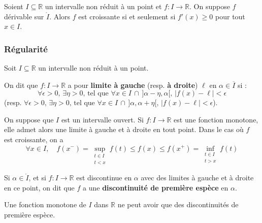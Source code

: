 
	\begin{proposition}
		Soient $I \subseteq \mathbb{R}$ un intervalle non réduit à un point et $f : I \rightarrow \mathbb{R}$. On suppose $f$ dérivable sur $\mathring{I}$. Alors $f$ est croissante si et seulement si $f'(x) \geq 0$ pour tout $x \in I$.
	\end{proposition}

	\subsubsection{Régularité}


	Soit $I \subseteq \mathbb{R}$ un intervalle non réduit à un point.

	\begin{definition}
		On dit que $f : I \rightarrow \mathbb{R}$ a pour \textbf{limite à gauche} (resp. \textbf{à droite}) $\ell$ en $\alpha \in \overline{I}$ si :
		\[ \forall \epsilon > 0, \, \exists \eta > 0, \, \text{tel que } \forall x \in I \, \cap \, ]\alpha-\eta, \alpha[, \, |f(x) - \ell| < \epsilon \]
		(resp. $\forall \epsilon > 0, \, \exists \eta > 0, \, \text{tel que } \forall x \in I \, \cap \, ]\alpha, \alpha+\eta[, \, |f(x) - \ell| < \epsilon$).
	\end{definition}

	\begin{theorem}
		On suppose que $I$ est un intervalle ouvert. Si $f : I \rightarrow \mathbb{R}$ est une fonction monotone, elle admet alors une limite à gauche et à droite en tout point. Dans le cas où $f$ est croissante, on a
		\[ \forall x \in I, \quad f(x^-) = \sup_{\substack{t \in I \\ t < x}} f(t) \leq f(x) \leq f(x^+) = \inf_{\substack{t \in I \\ t > x}} f(t) \]
	\end{theorem}

	\begin{definition}
		Si $\alpha \in \mathring{I}$, et si $f : I \rightarrow \mathbb{R}$ est discontinue en $\alpha$ avec des limites à gauche et à droite en ce point, on dit que $f$ a une \textbf{discontinuité de première espèce} en $\alpha$.
	\end{definition}

	\begin{proposition}
		Une fonction monotone de $I$ dans $\mathbb{R}$ ne peut avoir que des discontinuités de première espèce.
	\end{proposition}

